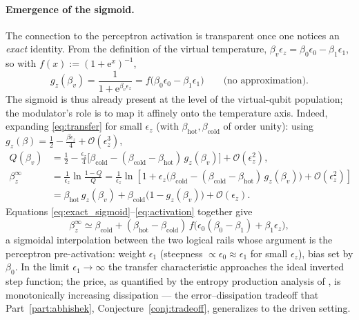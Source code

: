 \documentclass[11pt,a4paper]{article}
\theoremstyle{definition}
\theoremstyle{remark}
\newcommand{\ee}{\mathrm{e}}
\begin{document}
\paragraph{Emergence of the sigmoid.}
The connection to the perceptron activation is transparent once one
notices an \emph{exact} identity. From the definition of the virtual
temperature, $\beta_v\epsilon_z = \beta_0\epsilon_0-\beta_1\epsilon_1$,
so with $f(x):=(1+\ee^{x})^{-1}$,
\begin{equation}
g_z(\beta_v)
= \frac{1}{1+\ee^{\beta_v\epsilon_z}}
= f\big(\beta_0\epsilon_0-\beta_1\epsilon_1\big)
\qquad \text{(no approximation)} .
\label{eq:exact_sigmoid}
\end{equation}
The sigmoid is thus already present at the level of the virtual-qubit
population; the modulator's role is to map it affinely onto the
temperature axis. Indeed, expanding \eqref{eq:transfer} for small
$\epsilon_z$ (with $\beta_{\mathrm{hot}},\beta_{\mathrm{cold}}$ of order
unity): using $g_z(\beta)=\tfrac12-\tfrac{\beta\epsilon_z}{4}
+\mathcal{O}(\epsilon_z^{3})$,
\begin{align}
Q(\beta_v)
&= \tfrac12 - \frac{\epsilon_z}{4}
\Big[\beta_{\mathrm{cold}}
- (\beta_{\mathrm{cold}}-\beta_{\mathrm{hot}})\,g_z(\beta_v)\Big]
+\mathcal{O}(\epsilon_z^{2}) ,\\[2pt]
\beta_z^\infty
&= \frac{1}{\epsilon_z}
\ln\frac{1-Q}{Q}
= \frac{1}{\epsilon_z}
\ln\!\left[1+\epsilon_z
\Big(\beta_{\mathrm{cold}}
-(\beta_{\mathrm{cold}}-\beta_{\mathrm{hot}})\,g_z(\beta_v)\Big)
+\mathcal{O}(\epsilon_z^{2})\right] \nonumber\\[2pt]
&= \beta_{\mathrm{hot}}\, g_z(\beta_v)
+ \beta_{\mathrm{cold}}\big(1-g_z(\beta_v)\big)
+ \mathcal{O}(\epsilon_z).
\label{eq:activation}
\end{align}
Equations \eqref{eq:exact_sigmoid}--\eqref{eq:activation} together give
\begin{equation}
\beta_z^\infty
\simeq \beta_{\mathrm{cold}}
+ (\beta_{\mathrm{hot}}-\beta_{\mathrm{cold}})\,
f\big(\epsilon_0(\beta_0-\beta_1) + \beta_1\epsilon_z\big),
\end{equation}
a sigmoidal interpolation between the two logical rails whose argument
is the perceptron pre-activation: weight $\epsilon_1$
(steepness $\propto\epsilon_0\approx\epsilon_1$ for small
$\epsilon_z$), bias set by $\beta_0$. In the limit
$\epsilon_1\to\infty$ the transfer characteristic approaches the ideal
inverted step function; the price, as quantified by the entropy
production analysis of \cite{LipkaBartosik2024}, is monotonically
increasing dissipation --- the error--dissipation tradeoff that
Part~\ref{part:abhishek}, Conjecture~\ref{conj:tradeoff}, generalizes to
the driven setting.
 
\end{document}
